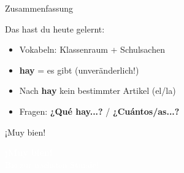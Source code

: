 \documentclass[aspectratio=169, 11pt]{beamer}
\newcommand{\es}[1]{\textbf{\textcolor{spanischrot}{#1}}}
\begin{document}
\begin{frame}{Zusammenfassung}

\begin{block}{Das hast du heute gelernt:}
\begin{itemize}
    \item Vokabeln: Klassenraum + Schulsachen
    \item \es{hay} = es gibt (unveränderlich!)
    \item Nach \es{hay} kein bestimmter Artikel (el/la)
    \item Fragen: \es{¿Qué hay...?} / \es{¿Cuántos/as...?}
\end{itemize}
\end{block}

\vspace{0.8cm}

\begin{center}
{\Large\textcolor{spanischrot}{¡Muy bien!}}
\end{center}

\end{frame}

{
\begin{frame}[plain]
\begin{center}
\vspace{3cm}
{\Huge\bfseries\textcolor{white}{¡Muy bien!}}\\[1cm]
{\Large\textcolor{white}{Bis zur nächsten Stunde!}}
\end{center}
\end{frame}
}
\end{document}
